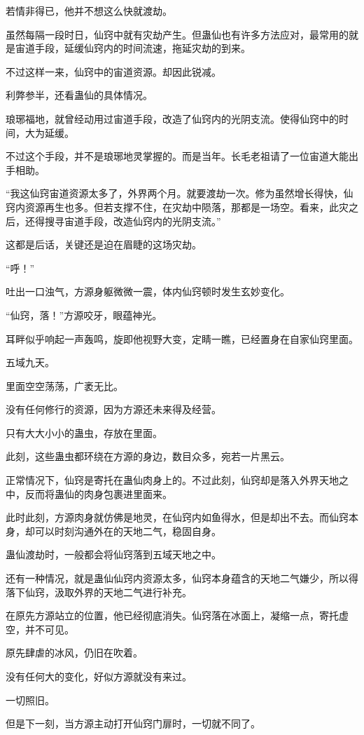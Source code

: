\begin{this_body}
若情非得已，他并不想这么快就渡劫。

虽然每隔一段时日，仙窍中就有灾劫产生。但蛊仙也有许多方法应对，最常用的就是宙道手段，延缓仙窍内的时间流速，拖延灾劫的到来。

不过这样一来，仙窍中的宙道资源。却因此锐减。

利弊参半，还看蛊仙的具体情况。

琅琊福地，就曾经动用过宙道手段，改造了仙窍内的光阴支流。使得仙窍中的时间，大为延缓。

不过这个手段，并不是琅琊地灵掌握的。而是当年。长毛老祖请了一位宙道大能出手相助。

“我这仙窍宙道资源太多了，外界两个月。就要渡劫一次。修为虽然增长得快，仙窍内资源再生也多。但若支撑不住，在灾劫中陨落，那都是一场空。看来，此灾之后，还得搜寻宙道手段，改造仙窍内的光阴支流。”

这都是后话，关键还是迫在眉睫的这场灾劫。

“呼！”

吐出一口浊气，方源身躯微微一震，体内仙窍顿时发生玄妙变化。

“仙窍，落！”方源咬牙，眼蕴神光。

耳畔似乎响起一声轰鸣，旋即他视野大变，定睛一瞧，已经置身在自家仙窍里面。

五域九天。

里面空空荡荡，广袤无比。

没有任何修行的资源，因为方源还未来得及经营。

只有大大小小的蛊虫，存放在里面。

此刻，这些蛊虫都环绕在方源的身边，数目众多，宛若一片黑云。

正常情况下，仙窍是寄托在蛊仙肉身上的。不过此刻，仙窍却是落入外界天地之中，反而将蛊仙的肉身包裹进里面来。

此时此刻，方源肉身就仿佛是地灵，在仙窍内如鱼得水，但是却出不去。而仙窍本身，却可以时刻沟通外在的天地二气，稳固自身。

蛊仙渡劫时，一般都会将仙窍落到五域天地之中。

还有一种情况，就是蛊仙仙窍内资源太多，仙窍本身蕴含的天地二气嫌少，所以得落下仙窍，汲取外界的天地二气进行补充。

在原先方源站立的位置，他已经彻底消失。仙窍落在冰面上，凝缩一点，寄托虚空，并不可见。

原先肆虐的冰风，仍旧在吹着。

没有任何大的变化，好似方源就没有来过。

一切照旧。

但是下一刻，当方源主动打开仙窍门扉时，一切就不同了。


\end{this_body}
